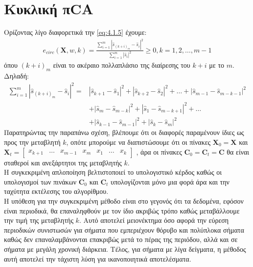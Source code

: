 \section{Κυκλική πCA}
\justifying
Ορίζοντας λίγο διαφορετικά την \eqref{eq:4.1.5} έχουμε:
\begin{align*}
    e_{circ}\left (\mathbf{X},w,k\right ) = 
    \frac{ \sum \limits_{i=1}^{m} \left | \hat{s}_{(k+i)_{m}} - \hat{s}_i \right |^2}{ \sum \limits_{i=1}^{m} \left | \hat{s}_i \right |^2} \geq 0, k = 1,2,\ldots,m-1
\end{align*}
όπου $(k+i)_{m}$ είναι το ακέραιο πολλαπλάσιο της διαίρεσης του $k+i$ με το $m$. Δηλαδή:
\begin{align*}
    \sum \limits_{i=1}^{m} \left | \hat{s}_{(k+i)_m} -\hat{s}_i \right |^2 = &|\hat{s}_{k+1}-\hat{s}_1|^2 + |\hat{s}_{k+2}-\hat{s}_2|^2 + \ldots + |\hat{s}_{m-1} -\hat{s}_{m-k-1}|^2 \\
    &+ |\hat{s}_{m}-\hat{s}_{m-k}|^2 + |\hat{s}_1 -\hat{s}_{m-k+1}|^2 + \ldots \\
    &+ |\hat{s}_{k-1} - \hat{s}_{m-1}|^2 + |\hat{s}_k - \hat{s}_m|^2
\end{align*}
\newpage
\noindent Παρατηρώντας την παραπάνω σχέση, βλέπουμε ότι οι διαφορές παραμένουν ίδιες ως προς την μεταβλητή $k$, οπότε μπορούμε να διαπιστώσουμε ότι οι πίνακες $\mathbf{X}_0 = \mathbf{X}$ και $\mathbf{X}_t = \begin{bmatrix}
x_{k+1} & \ldots & x_{m-1} & x_{m} & x_1 & \ldots & x_{k}
\end{bmatrix}$ , άρα οι πίνακες $\mathbf{C}_0 = \mathbf{C}_t = \mathbf{C}$ θα είναι σταθεροί και ανεξάρτητοι της μεταβλητής $k$.
\\[0.5 \baselineskip]
Η συγκεκριμένη απλοποίηση βελτιστοποιεί το υπολογιστικό κέρδος καθώς οι υπολογισμοί των πινάκων $\mathbf{C}_0$ και $\mathbf{C}_t$ υπολογίζονται μόνο μια φορά άρα και την ταχύτητα εκτέλεσης του αλγορίθμου.
\\[0.5 \baselineskip]
Η υπόθεση για την συγκεκριμένη μέθοδο είναι στο γεγονός ότι τα δεδομένα, εφόσον είναι περιοδικά, θα επαναληφθούν με τον ίδιο ακριβώς τρόπο καθώς μεταβάλλουμε την τιμή της μεταβλητής $k$. Αυτό αποτελεί μειονέκτημα όσο αφορά την εύρεση περιοδικών συνιστωσών για σήματα που εμπεριέχουν θόρυβο και πολύπλοκα σήματα καθώς δεν επαναλαμβάνονται επακριβώς μετά το πέρας της περιόδου, αλλά και σε σήματα με μεγάλη χρονική διάρκεια. Τέλος, για σήματα με λίγα δείγματα, η μέθοδος αυτή αποτελεί την τάχιστη λύση για ικανοποιητικά αποτελέσματα.
